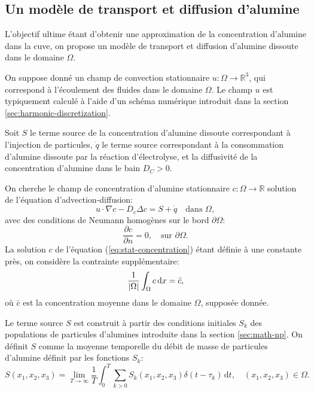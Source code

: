 %

\subsection{Un modèle de transport et diffusion d'alumine}\label{sec:harmonic-c}
L'objectif ultime étant d'obtenir une approximation de la
concentration d'alumine dans la cuve, on propose un modèle de
transport et diffusion d'alumine dissoute dans le domaine $\Omega$.

On suppose donné un champ de convection stationnaire $u:\Omega\to\mathbb R^3$,
qui correspond à l'écoulement des fluides dans le domaine
$\Omega$. Le champ $u$ est typiquement calculé à l'aide d'un
schéma numérique introduit dans la section
\ref{sec:harmonic-discretization}.

Soit $S$ le terme source de la concentration d'alumine dissoute
correspondant à l'injection de particules, $\dot
q$ le terme source correspondant à la consommation d'alumine
dissoute par la réaction d'électrolyse, et la diffusivité de la
concentration d'alumine dans le bain $D_C > 0$.

On cherche le champ de concentration d'alumine stationnaire
$c:\Omega\to\mathbb R$ solution de l'équation d'advection-diffusion:
\begin{equation}\label{eq:stat-concentration}
  u\cdot \nabla c - D_c \Delta c = S + \dot q\quad \text{dans } \Omega,
\end{equation}
avec des conditions de Neumann homogènes sur le bord $\partial
\Omega$:
\begin{equation}
  \frac{\partial c}{\partial n} = 0,\quad\text{sur } \partial \Omega.
\end{equation}
La solution $c$ de l'équation (\ref{eq:stat-concentration}) étant
définie à une constante près, on considère la contrainte
supplémentaire:
\begin{equation}
  \frac{1}{\left\lvert \Omega \right\rvert}\int_\Omega c\,\mathrm dx = \bar c,
\end{equation}
où $\bar c$ est la concentration moyenne dans le domaine $\Omega$,
supposée donnée.

Le terme source $S$ est construit à partir des conditions initiales
$S_k$ des populations de particules d'alumines introduite dans la
section \ref{sec:math-np}. On définit $S$ comme la moyenne
temporelle du débit de masse de particules d'alumine définit par
les fonctions $S_k$:
\begin{equation}
  S(x_1,x_2,x_3) = \lim_{T\to\infty}\frac{1}{T}\int_0^T \sum_{k>0}
  S_k(x_1, x_2, x_3) \delta(t - \tau_k)\,\mathrm dt, \quad (x_1, x_2, x_3)\in\Omega.
\end{equation}

